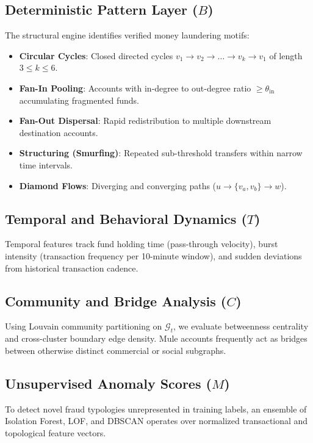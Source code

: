 \documentclass[journal]{IEEEtran}
\begin{document}
\subsection{Deterministic Pattern Layer ($B$)}
The structural engine identifies verified money laundering motifs:
\begin{itemize}
    \item \textbf{Circular Cycles}: Closed directed cycles $v_1 \to v_2 \to \dots \to v_k \to v_1$ of length $3 \le k \le 6$.
    \item \textbf{Fan-In Pooling}: Accounts with in-degree to out-degree ratio $\ge \theta_{\text{in}}$ accumulating fragmented funds.
    \item \textbf{Fan-Out Dispersal}: Rapid redistribution to multiple downstream destination accounts.
    \item \textbf{Structuring (Smurfing)}: Repeated sub-threshold transfers within narrow time intervals.
    \item \textbf{Diamond Flows}: Diverging and converging paths ($u \to \{v_a, v_b\} \to w$).
\end{itemize}

\subsection{Temporal and Behavioral Dynamics ($T$)}
Temporal features track fund holding time (pass-through velocity), burst intensity (transaction frequency per 10-minute window), and sudden deviations from historical transaction cadence.

\subsection{Community and Bridge Analysis ($C$)}
Using Louvain community partitioning on $\mathcal{G}_t$, we evaluate betweenness centrality and cross-cluster boundary edge density. Mule accounts frequently act as bridges between otherwise distinct commercial or social subgraphs.

\subsection{Unsupervised Anomaly Scores ($M$)}
To detect novel fraud typologies unrepresented in training labels, an ensemble of Isolation Forest, LOF, and DBSCAN operates over normalized transactional and topological feature vectors.
\end{document}
